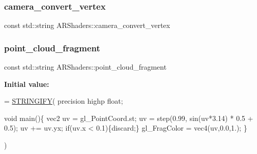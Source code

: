 \subsubsection{\texorpdfstring{camera\+\_\+convert\+\_\+vertex}{camera\_convert\_vertex}}
{\footnotesize\ttfamily const std\+::string A\+R\+Shaders\+::camera\+\_\+convert\+\_\+vertex}

\mbox{\label{namespace_a_r_shaders_ad415abff7a73d38ae981dd4be29a7076}} 
\subsubsection{\texorpdfstring{point\+\_\+cloud\+\_\+fragment}{point\_cloud\_fragment}}
{\footnotesize\ttfamily const std\+::string A\+R\+Shaders\+::point\+\_\+cloud\+\_\+fragment}

{\bfseries Initial value\+:}
\begin{DoxyCode}
= \hyperlink{_a_r_shaders_8h_ab06e1eb2e9bf38e0d452b1f796aed208}{STRINGIFY}(
                                                   precision highp \textcolor{keywordtype}{float};
                                                   
                                                   
                                                   
                                                   
                                                   \textcolor{keywordtype}{void} main()\{
                                                       vec2 uv = gl\_PointCoord.st;
                                                       uv = step(0.99, sin(uv*3.14) * 0.5 + 0.5);
                                                       uv += uv.yx;
                                                       \textcolor{keywordflow}{if}(uv.x < 0.1)\{discard;\}
                                                       gl\_FragColor = vec4(uv,0.0,1.);
                                                   \}
                                                   
                                                   
                                                   
                                                   )
\end{DoxyCode}
\mbox{\label{namespace_a_r_shaders_ada1162901271506088cc985d466c8971}} 
